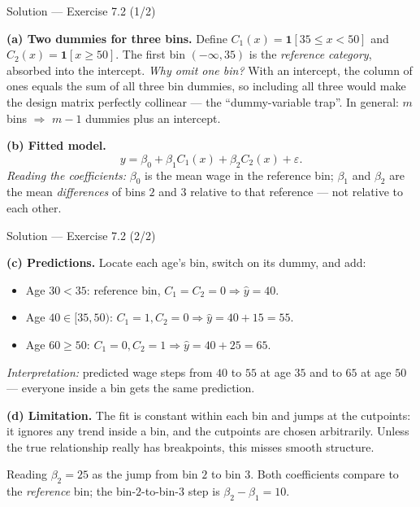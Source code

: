 \documentclass[aspectratio=169,11pt]{beamer}
\begin{document}
\begin{frame}{Solution --- Exercise 7.2 (1/2)}
\begin{solutionbox}
\textbf{(a) Two dummies for three bins.} Define $C_1(x)=\mathbf{1}[35\le x<50]$ and $C_2(x)=\mathbf{1}[x\ge 50]$. The first bin $(-\infty,35)$ is the \emph{reference category}, absorbed into the intercept. \emph{Why omit one bin?} With an intercept, the column of ones equals the sum of all three bin dummies, so including all three would make the design matrix perfectly collinear --- the ``dummy-variable trap''. In general: $m$ bins $\Rightarrow$ $m-1$ dummies plus an intercept.

\medskip
\textbf{(b) Fitted model.}
\[ y=\beta_0+\beta_1 C_1(x)+\beta_2 C_2(x)+\varepsilon. \]
\emph{Reading the coefficients:} $\beta_0$ is the mean wage in the reference bin; $\beta_1$ and $\beta_2$ are the mean \emph{differences} of bins $2$ and $3$ relative to that reference --- not relative to each other.
\end{solutionbox}
\end{frame}

\begin{frame}{Solution --- Exercise 7.2 (2/2)}
\begin{solutionbox}
\textbf{(c) Predictions.} Locate each age's bin, switch on its dummy, and add:
\begin{itemize}
  \item Age $30<35$: reference bin, $C_1=C_2=0\Rightarrow \hat y=40$.
  \item Age $40\in[35,50)$: $C_1=1,C_2=0\Rightarrow \hat y=40+15=55$.
  \item Age $60\ge50$: $C_1=0,C_2=1\Rightarrow \hat y=40+25=65$.
\end{itemize}
\emph{Interpretation:} predicted wage steps from $40$ to $55$ at age $35$ and to $65$ at age $50$ --- everyone inside a bin gets the same prediction.

\medskip
\textbf{(d) Limitation.} The fit is constant within each bin and jumps at the cutpoints: it ignores any trend inside a bin, and the cutpoints are chosen arbitrarily. Unless the true relationship really has breakpoints, this misses smooth structure.
\end{solutionbox}
\begin{mistake}
Reading $\beta_2=25$ as the jump from bin $2$ to bin $3$. Both coefficients compare to the \emph{reference} bin; the bin-$2$-to-bin-$3$ step is $\beta_2-\beta_1=10$.
\end{mistake}
\end{frame}
\end{document}

